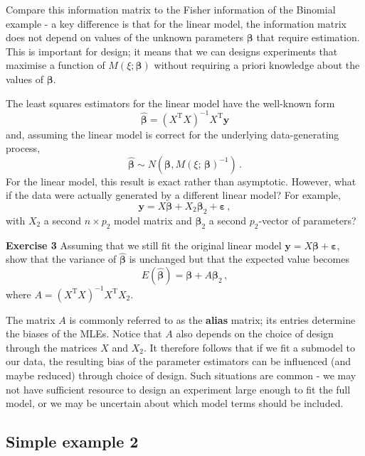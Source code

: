 \documentclass[
]{article}
\begin{document}
Compare this information matrix to the Fisher information of the
Binomial example - a key difference is that for the linear model, the
information matrix does not depend on values of the unknown parameters
\(\boldsymbol{\beta}\) that require estimation. This is important for
design; it means that we can designs experiments that maximise a
function of \(M(\xi; \boldsymbol{\beta})\) without requiring a priori
knowledge about the values of \(\boldsymbol{\beta}\).

The least squares estimators for the linear model have the well-known
form \[
\hat{\boldsymbol{\beta}} = \left(X^\mathrm{T}X\right)^{-1}X^\mathrm{T}\boldsymbol{y}
\] and, assuming the linear model is correct for the underlying
data-generating process, \[
\hat{\boldsymbol{\beta}}\sim N\left(\boldsymbol{\beta}, M(\xi;\,\boldsymbol{\beta})^{-1}\right)\,.
\] For the linear model, this result is exact rather than asymptotic.
However, what if the data were actually generated by a different linear
model? For example, \[
\boldsymbol{y}= X\boldsymbol{\beta}+ X_2\boldsymbol{\beta}_2 + \boldsymbol{\varepsilon}\,,
\] with \(X_2\) a second \(n\times p_2\) model matrix and
\(\boldsymbol{\beta}_2\) a second \(p_2\)-vector of parameters?

\textbf{Exercise 3} Assuming that we still fit the original linear model
\(\boldsymbol{y}= X\boldsymbol{\beta}+ \boldsymbol{\varepsilon}\), show
that the variance of \(\hat{\boldsymbol{\beta}}\) is unchanged but that
the expected value becomes \[
E(\hat{\boldsymbol{\beta}}) = \boldsymbol{\beta}+ A\boldsymbol{\beta}_2\,,
\] where \(A = \left(X^\mathrm{T}X\right)^{-1}X^\mathrm{T}X_2\).

The matrix \(A\) is commonly referred to as the \textbf{alias} matrix;
its entries determine the biases of the MLEs. Notice that \(A\) also
depends on the choice of design through the matrices \(X\) and \(X_2\).
It therefore follows that if we fit a submodel to our data, the
resulting bias of the parameter estimators can be influenced (and maybe
reduced) through choice of design. Such situations are common - we may
not have sufficient resource to design an experiment large enough to fit
the full model, or we may be uncertain about which model terms should be
included.

\hypertarget{simple-example-2}{%
\subsection{Simple example 2}\label{simple-example-2}}
\end{document}
